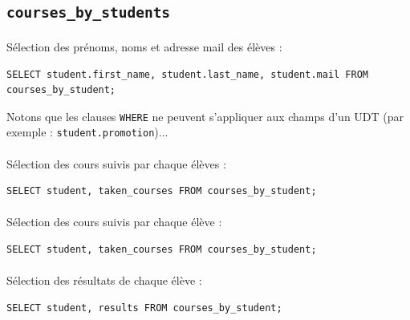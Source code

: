 \documentclass[a4paper, 11pt]{article}
\begin{document}
\subsection{\texttt{courses\_by\_students}}

\paragraph{}
Sélection des prénoms, noms et adresse mail des élèves :
\scriptsize
\begin{tcolorbox}
\begin{lstlisting}
SELECT student.first_name, student.last_name, student.mail FROM courses_by_student;
\end{lstlisting}
\end{tcolorbox}
\normalsize
Notons que les clauses \texttt{WHERE} ne peuvent s'appliquer aux champs d'un UDT (par exemple : \texttt{student.promotion})...

\paragraph{}
Sélection des cours suivis par chaque élèves :
\begin{tcolorbox}
\begin{lstlisting}
SELECT student, taken_courses FROM courses_by_student;
\end{lstlisting}
\end{tcolorbox}

\paragraph{}
Sélection des cours suivis par chaque élève :
\begin{tcolorbox}
\begin{lstlisting}
SELECT student, taken_courses FROM courses_by_student;
\end{lstlisting}
\end{tcolorbox}

\paragraph{}
Sélection des résultats de chaque élève :
\begin{tcolorbox}
\begin{lstlisting}
SELECT student, results FROM courses_by_student;
\end{lstlisting}
\end{tcolorbox}
\end{document}
